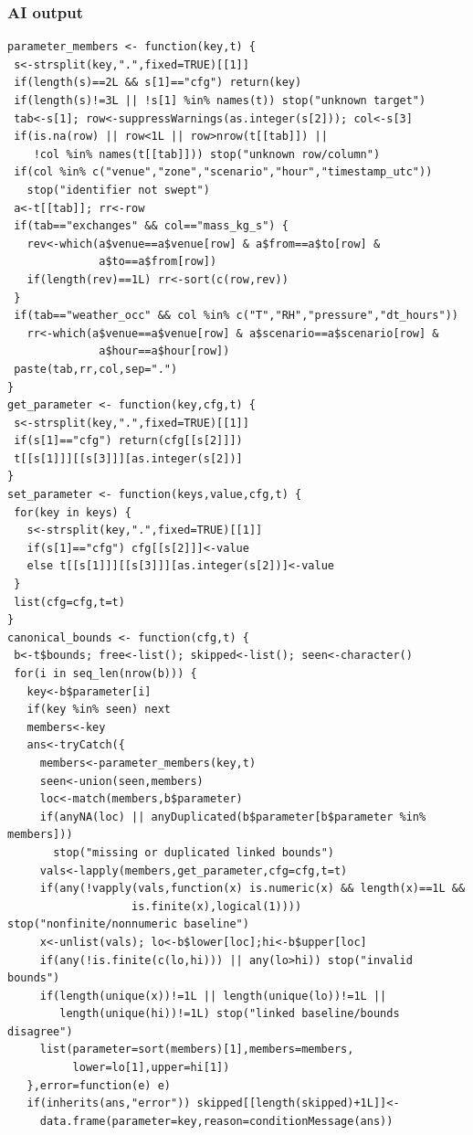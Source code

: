 \subsubsection*{AI output}
\begin{lstlisting}[style=Rcode]
parameter_members <- function(key,t) {
 s<-strsplit(key,".",fixed=TRUE)[[1]]
 if(length(s)==2L && s[1]=="cfg") return(key)
 if(length(s)!=3L || !s[1] %in% names(t)) stop("unknown target")
 tab<-s[1]; row<-suppressWarnings(as.integer(s[2])); col<-s[3]
 if(is.na(row) || row<1L || row>nrow(t[[tab]]) ||
    !col %in% names(t[[tab]])) stop("unknown row/column")
 if(col %in% c("venue","zone","scenario","hour","timestamp_utc"))
   stop("identifier not swept")
 a<-t[[tab]]; rr<-row
 if(tab=="exchanges" && col=="mass_kg_s") {
   rev<-which(a$venue==a$venue[row] & a$from==a$to[row] &
              a$to==a$from[row])
   if(length(rev)==1L) rr<-sort(c(row,rev))
 }
 if(tab=="weather_occ" && col %in% c("T","RH","pressure","dt_hours"))
   rr<-which(a$venue==a$venue[row] & a$scenario==a$scenario[row] &
              a$hour==a$hour[row])
 paste(tab,rr,col,sep=".")
}
get_parameter <- function(key,cfg,t) {
 s<-strsplit(key,".",fixed=TRUE)[[1]]
 if(s[1]=="cfg") return(cfg[[s[2]]])
 t[[s[1]]][[s[3]]][as.integer(s[2])]
}
set_parameter <- function(keys,value,cfg,t) {
 for(key in keys) {
   s<-strsplit(key,".",fixed=TRUE)[[1]]
   if(s[1]=="cfg") cfg[[s[2]]]<-value
   else t[[s[1]]][[s[3]]][as.integer(s[2])]<-value
 }
 list(cfg=cfg,t=t)
}
canonical_bounds <- function(cfg,t) {
 b<-t$bounds; free<-list(); skipped<-list(); seen<-character()
 for(i in seq_len(nrow(b))) {
   key<-b$parameter[i]
   if(key %in% seen) next
   members<-key
   ans<-tryCatch({
     members<-parameter_members(key,t)
     seen<-union(seen,members)
     loc<-match(members,b$parameter)
     if(anyNA(loc) || anyDuplicated(b$parameter[b$parameter %in% members]))
       stop("missing or duplicated linked bounds")
     vals<-lapply(members,get_parameter,cfg=cfg,t=t)
     if(any(!vapply(vals,function(x) is.numeric(x) && length(x)==1L &&
                   is.finite(x),logical(1)))) stop("nonfinite/nonnumeric baseline")
     x<-unlist(vals); lo<-b$lower[loc];hi<-b$upper[loc]
     if(any(!is.finite(c(lo,hi))) || any(lo>hi)) stop("invalid bounds")
     if(length(unique(x))!=1L || length(unique(lo))!=1L ||
        length(unique(hi))!=1L) stop("linked baseline/bounds disagree")
     list(parameter=sort(members)[1],members=members,
          lower=lo[1],upper=hi[1])
   },error=function(e) e)
   if(inherits(ans,"error")) skipped[[length(skipped)+1L]]<-
     data.frame(parameter=key,reason=conditionMessage(ans))

\end{lstlisting}
